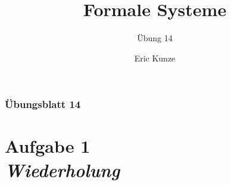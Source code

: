 \documentclass{beamer}
\begin{document}
	
	\title{Formale Systeme}
	\subtitle{Übung 14}
	\author{Eric Kunze}
	\date{}

	\maketitle


	\begin{frame} \frametitle{Übungsblatt 14}
		\tableofcontents
	\end{frame}

	
	\section{Aufgabe 1 \\ \itshape Wiederholung}
	
\end{document}
